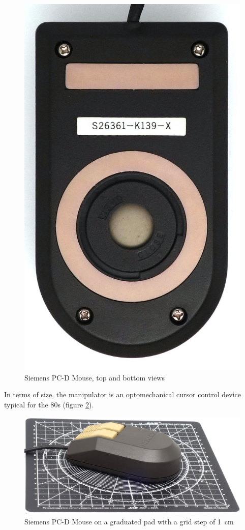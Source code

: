 \documentclass[11pt, a4paper]{article}
\begin{document}
\begin{figure}[h]
    \includegraphics[scale=0.5]{1985_siemens_pcd_mouse/bottom_30.jpg}
    \caption{Siemens PC-D Mouse, top and bottom views}
    \label{fig:SiemensPCDTopBottom}
\end{figure}

In terms of size, the manipulator is an optomechanical cursor control device typical for the 80s (figure \ref{fig:SiemensPCDSize}). 

\begin{figure}[h]
    \centering
    \includegraphics[scale=0.45]{1985_siemens_pcd_mouse/size_30.jpg}
    \caption{Siemens PC-D Mouse on a graduated pad with a grid step of 1~cm}
    \label{fig:SiemensPCDSize}
\end{figure}
\end{document}
